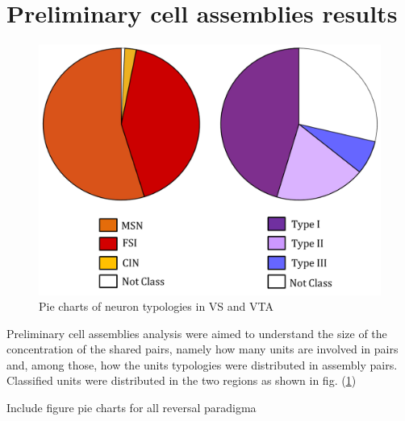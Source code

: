\section{Preliminary cell assemblies results}
\begin{figure}
    \centering
    \includegraphics[scale=0.3]{figures/GlobalRegionPieandLegenda1.png}
    \caption{Pie charts of neuron typologies in VS and VTA }
    \label{fig:GlobalPie}
\end{figure}
Preliminary cell assemblies analysis were aimed to understand the size of the concentration of the shared pairs, namely how many units are involved in pairs and, among those, how the units typologies were distributed in assembly pairs. Classified units were distributed in the two regions as shown in fig. (\ref{fig:GlobalPie})

{\color{red} Include figure pie charts for all reversal paradigma}
